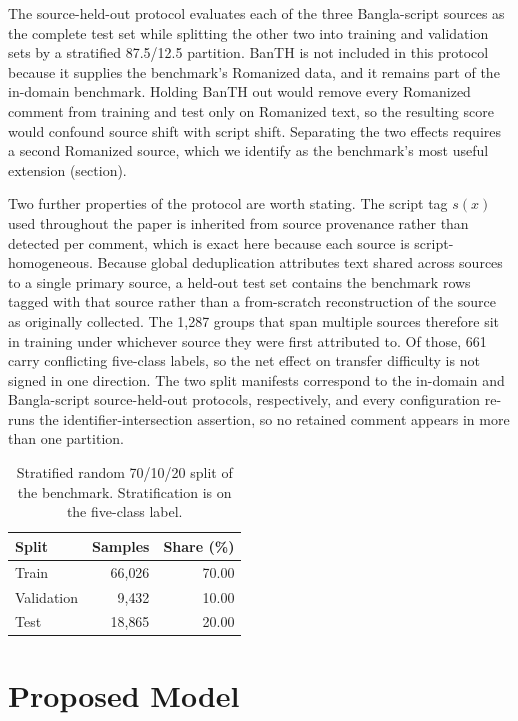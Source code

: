 \documentclass[11pt,a4paper]{article}
\def\cref#1{section}%
\begin{document}
The source-held-out protocol evaluates each of the three Bangla-script sources as the complete test set while splitting the other two into training and validation sets by a stratified 87.5/12.5 partition. BanTH is not included in this protocol because it supplies the benchmark's Romanized data, and it remains part of the in-domain benchmark. Holding BanTH out would remove every Romanized comment from training and test only on Romanized text, so the resulting score would confound source shift with script shift. Separating the two effects requires a second Romanized source, which we identify as the benchmark's most useful extension (\cref{sec:limitations}).

Two further properties of the protocol are worth stating. The script tag $s(x)$ used throughout the paper is inherited from source provenance rather than detected per comment, which is exact here because each source is script-homogeneous. Because global deduplication attributes text shared across sources to a single primary source, a held-out test set contains the benchmark rows tagged with that source rather than a from-scratch reconstruction of the source as originally collected. The 1{,}287 groups that span multiple sources therefore sit in training under whichever source they were first attributed to. Of those, 661 carry conflicting five-class labels, so the net effect on transfer difficulty is not signed in one direction. The two split manifests correspond to the in-domain and Bangla-script source-held-out protocols, respectively, and every configuration re-runs the identifier-intersection assertion, so no retained comment appears in more than one partition.

\begin{table}[!htbp]
\centering
\caption{Stratified random 70/10/20 split of the benchmark. Stratification is on the five-class label.}
\label{tab:split}
\small
\begin{tabular}{@{}lrr@{}}
\toprule
\textbf{Split} & \textbf{Samples} & \textbf{Share (\%)} \\
\midrule
Train & 66{,}026 & 70.00 \\
Validation & 9{,}432 & 10.00 \\
Test & 18{,}865 & 20.00 \\
\bottomrule
\end{tabular}
\end{table}

\section{Proposed Model}
\label{sec:methodology}
\end{document}
